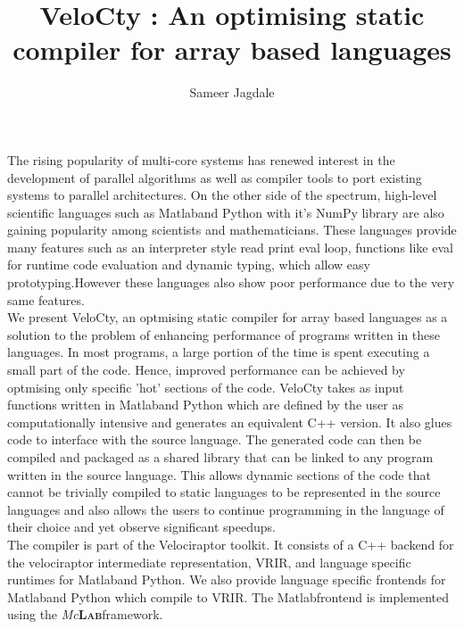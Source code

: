 \documentclass[a4paper, 12pt]{article}
\newcommand{\matlab}{{\textsc Matlab}\space}
\newcommand{\smclab}{\textrm{\textsl{Mc}\textbf{\textsc{Lab}}}}
\newcommand{\mclab}{\smclab\space}
\begin{document}
\title{VeloCty : An optimising static compiler for array based languages}
\author{Sameer Jagdale}
\maketitle
The rising popularity of multi-core systems has renewed interest in the development of parallel algorithms as well as compiler tools to port existing systems to parallel architectures. On the other side of the spectrum, high-level scientific languages such as \matlab and Python with it's NumPy library are also gaining popularity among scientists and mathematicians. These languages provide many features such as an interpreter style read print eval loop, functions like eval for runtime code evaluation and dynamic typing, which allow easy prototyping.However these languages also show poor performance due to the very same features. \\
We present VeloCty, an optmising static compiler for array based languages as a solution to the problem of enhancing performance of programs written in these languages. In most programs, a large portion of the time is spent executing a small part of the code. Hence, improved performance can be achieved by optmising only specific 'hot' sections of the code. VeloCty takes as input functions written in \matlab and Python which are defined by the user as computationally intensive and generates an equivalent C++ version. It also glues code to interface with the source language. The generated code can then be compiled and packaged as a shared library that can be linked to any program written in the source language. This allows dynamic sections of the code that cannot be trivially compiled to static languages to be represented in the source languages and also allows the users to continue programming in the language of their choice and yet observe significant speedups. \\
The compiler is part of the Velociraptor toolkit. It consists of a C++ backend for the velociraptor intermediate representation, VRIR, and language specific runtimes for \matlab and Python. We also provide language specific frontends for \matlab and Python which compile to VRIR. The \matlab frontend is implemented using the \mclab framework.
\end{document}
